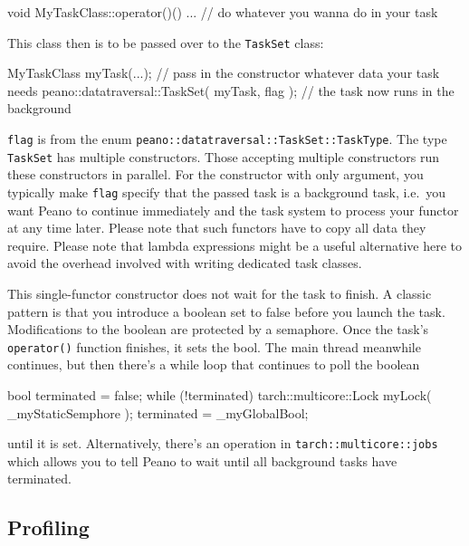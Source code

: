 \begin{code}
  void MyTaskClass::operator()() {
   ...   // do whatever you wanna do in your task 
  } 
\end{code}

\noindent
This class then is to be passed over to the \texttt{TaskSet} class:

\begin{code}
  MyTaskClass myTask(...); // pass in the constructor whatever data your task needs 
  peano::datatraversal::TaskSet( myTask, flag ); // the task now runs in the background
\end{code}

\noindent
\texttt{flag} is from the enum \texttt{peano::datatraversal::TaskSet::TaskType}.
The type \texttt{TaskSet} has multiple constructors. 
Those accepting multiple constructors run these constructors in parallel. 
For the constructor with only argument, you typically make \texttt{flag} specify that 
the passed task is a background task, i.e.~you want Peano to continue immediately 
and the task system to process your functor at any time later. 
Please note that such functors have to copy all data they require.
Please note that lambda expressions might be a useful alternative here to avoid
the overhead involved with writing dedicated task classes.



This single-functor constructor does not wait for the task to finish.
A classic pattern is that you introduce a boolean set to false before you launch
the task.
Modifications to the boolean are protected by a semaphore.
Once the task's \texttt{operator()} function finishes, it sets the bool.
The main thread meanwhile continues, but then there's a while loop that
continues to poll the boolean

\begin{code}
  bool terminated = false;
  while (!terminated) {
    tarch::multicore::Lock myLock( _myStaticSemphore );
    terminated = _myGlobalBool;
  }
\end{code}

\noindent
until it is set. Alternatively, there's an operation in \texttt{tarch::multicore::jobs} which 
allows you to tell Peano to wait until all background tasks have terminated.





\subsection{Profiling}

